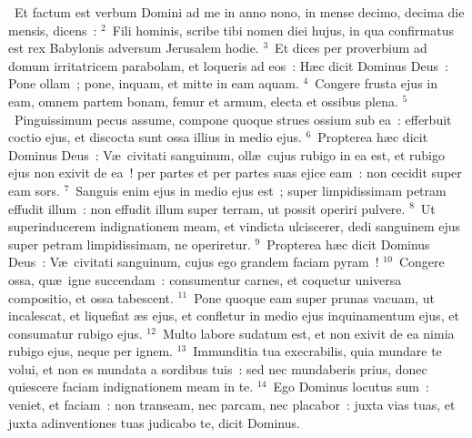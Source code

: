 ~Et factum est verbum Domini ad me in anno nono, in mense decimo, decima die mensis, dicens~:
${}^{2}$~Fili hominis, scribe tibi nomen diei hujus, in qua confirmatus est rex Babylonis adversum Jerusalem hodie.
${}^{3}$~Et dices per proverbium ad domum irritatricem parabolam, et loqueris ad eos~: H\ae c dicit Dominus Deus~: Pone ollam~; pone, inquam, et mitte in eam aquam.
${}^{4}$~Congere frusta ejus in eam, omnem partem bonam, femur et armum, electa et ossibus plena.
${}^{5}$~Pinguissimum pecus assume, compone quoque strues ossium sub ea~: efferbuit coctio ejus, et discocta sunt ossa illius in medio ejus.
${}^{6}$~Propterea h\ae c dicit Dominus Deus~: V\ae\ civitati sanguinum, oll\ae\ cujus rubigo in ea est, et rubigo ejus non exivit de ea~! per partes et per partes suas ejice eam~: non cecidit super eam sors.
${}^{7}$~Sanguis enim ejus in medio ejus est~; super limpidissimam petram effudit illum~: non effudit illum super terram, ut possit operiri pulvere.
${}^{8}$~Ut superinducerem indignationem meam, et vindicta ulciscerer, dedi sanguinem ejus super petram limpidissimam, ne operiretur.
${}^{9}$~Propterea h\ae c dicit Dominus Deus~: V\ae\ civitati sanguinum, cujus ego grandem faciam pyram~!
${}^{10}$~Congere ossa, qu\ae\ igne succendam~: consumentur carnes, et coquetur universa compositio, et ossa tabescent.
${}^{11}$~Pone quoque eam super prunas vacuam, ut incalescat, et liquefiat \ae s ejus, et confletur in medio ejus inquinamentum ejus, et consumatur rubigo ejus.
${}^{12}$~Multo labore sudatum est, et non exivit de ea nimia rubigo ejus, neque per ignem.
${}^{13}$~Immunditia tua execrabilis, quia mundare te volui, et non es mundata a sordibus tuis~: sed nec mundaberis prius, donec quiescere faciam indignationem meam in te.
${}^{14}$~Ego Dominus locutus sum~: veniet, et faciam~: non transeam, nec parcam, nec placabor~: juxta vias tuas, et juxta adinventiones tuas judicabo te, dicit Dominus.



